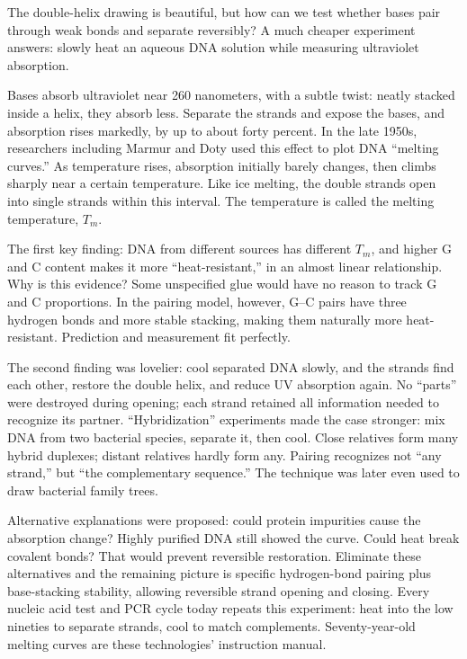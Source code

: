 \begin{zhengju}
The double-helix drawing is beautiful, but how can we test whether bases pair through weak bonds and separate reversibly? A much cheaper experiment answers: slowly heat an aqueous DNA solution while measuring ultraviolet absorption.

Bases absorb ultraviolet near 260 nanometers, with a subtle twist: neatly stacked inside a helix, they absorb less. Separate the strands and expose the bases, and absorption rises markedly, by up to about forty percent. In the late 1950s, researchers including Marmur and Doty used this effect to plot DNA ``melting curves.'' As temperature rises, absorption initially barely changes, then climbs sharply near a certain temperature. Like ice melting, the double strands open into single strands within this interval. The temperature is called the melting temperature, $T_m$.

The first key finding: DNA from different sources has different $T_m$, and higher G and C content makes it more ``heat-resistant,'' in an almost linear relationship. Why is this evidence? Some unspecified glue would have no reason to track G and C proportions. In the pairing model, however, G--C pairs have three hydrogen bonds and more stable stacking, making them naturally more heat-resistant. Prediction and measurement fit perfectly.

The second finding was lovelier: cool separated DNA slowly, and the strands find each other, restore the double helix, and reduce UV absorption again. No ``parts'' were destroyed during opening; each strand retained all information needed to recognize its partner. ``Hybridization'' experiments made the case stronger: mix DNA from two bacterial species, separate it, then cool. Close relatives form many hybrid duplexes; distant relatives hardly form any. Pairing recognizes not ``any strand,'' but ``the complementary sequence.'' The technique was later even used to draw bacterial family trees.

Alternative explanations were proposed: could protein impurities cause the absorption change? Highly purified DNA still showed the curve. Could heat break covalent bonds? That would prevent reversible restoration. Eliminate these alternatives and the remaining picture is specific hydrogen-bond pairing plus base-stacking stability, allowing reversible strand opening and closing. Every nucleic acid test and PCR cycle today repeats this experiment: heat into the low nineties to separate strands, cool to match complements. Seventy-year-old melting curves are these technologies' instruction manual.
\end{zhengju}

